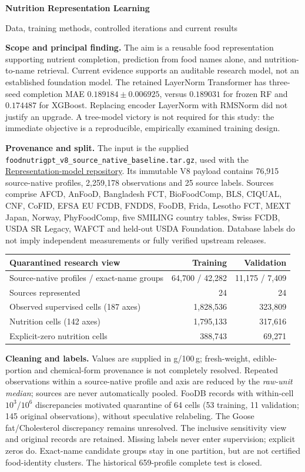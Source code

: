 \documentclass[10pt,a4paper]{article}
\newcommand{\sect}[1]{\vspace{3pt}{\large\bfseries\color{ink}#1}\par\vspace{2pt}}
\newcommand{\sub}[1]{\textbf{#1}\enspace}
\begin{document}
{\LARGE\bfseries\color{ink}Nutrition Representation Learning}\par
{\large Data, training methods, controlled iterations and current results}\par

\sub{Scope and principal finding.}
The aim is a reusable food representation supporting nutrient completion, prediction from food names alone, and nutrition-to-name retrieval. Current evidence supports an auditable research model, not an established foundation model. The retained LayerNorm Transformer has three-seed completion MAE $0.189184\pm0.006925$, versus $0.189031$ for frozen RF and $0.174487$ for XGBoost. Replacing encoder LayerNorm with RMSNorm did not justify an upgrade. A tree-model victory is not required for this study: the immediate objective is a reproducible, empirically examined training design.

\sect{1. Data preparation and evaluation protocol}
\sub{Provenance and split.}
The input is the supplied \nolinkurl{foodnutrigpt_v8_source_native_baseline.tar.gz}, used with the \href{https://github.com/mz1622/Representation-model}{Representation-model repository}. Its immutable V8 payload contains 76,915 source-native profiles, 2,259,178 observations and 25 source labels. Sources comprise AFCD, AnFooD, Bangladesh FCT, BioFoodComp, BLS, CIQUAL, CNF, CoFID, EFSA EU FCDB, FNDDS, FooDB, Frida, Lesotho FCT, MEXT Japan, Norway, PhyFoodComp, five SMILING country tables, Swiss FCDB, USDA SR Legacy, WAFCT and held-out USDA Foundation. Database labels do not imply independent measurements or fully verified upstream releases.

\begin{center}\small
\begin{tabular}{lrr}\toprule
Quarantined research view & Training & Validation\\\midrule
Source-native profiles / exact-name groups & 64,700 / 42,282 & 11,175 / 7,409\\
Sources represented & 24 & 24\\
Observed supervised cells (187 axes) & 1,828,536 & 323,809\\
Nutrition cells (142 axes) & 1,795,133 & 317,616\\
Explicit-zero nutrition cells & 388,743 & 69,271\\\bottomrule
\end{tabular}
\end{center}
\sub{Cleaning and labels.}
Values are supplied in g/100\,g; fresh-weight, edible-portion and chemical-form provenance is not completely resolved. Repeated observations within a source-native profile and axis are reduced by the \emph{raw-unit median}; sources are never automatically pooled. FooDB records with within-cell $10^3$/$10^6$ discrepancies motivated quarantine of 64 cells (53 training, 11 validation; 145 original observations), without speculative relabeling. The Goose fat/Cholesterol discrepancy remains unresolved. The inclusive sensitivity view and original records are retained. Missing labels never enter supervision; explicit zeros do. Exact-name candidate groups stay in one partition, but are not certified food-identity clusters. The historical 659-profile complete test is closed.
\end{document}
